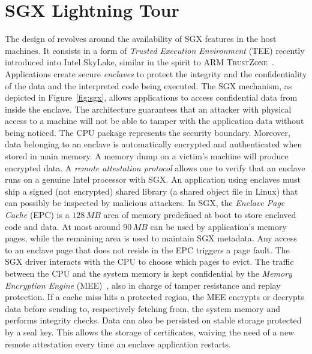 \section{SGX Lightning Tour}\label{sec:background}
The design of \SYS{} revolves around the availability of SGX features in the host machines.
It consists in a form of \emph{Trusted Execution Environment} (TEE) recently introduced into Intel SkyLake, similar in the spirit to ARM \textsc{TrustZone}~\cite{arm2009security}. 
Applications create secure \emph{enclaves} to protect the integrity and the confidentiality of the data and the interpreted code being executed. 
The SGX mechanism, as depicted in Figure~\ref{fig:sgx}, allows applications to access confidential data from inside the enclave. 
The architecture guarantees that an attacker with physical access to a machine will not be able to tamper with the application data without being noticed. 
The CPU package represents the security boundary. 
Moreover, data belonging to an enclave is automatically encrypted and authenticated when stored in main memory. 
A memory dump on a victim’s machine will produce encrypted data. 
A \emph{remote attestation protocol} allows one to verify that an enclave runs on a genuine Intel processor with SGX.
An application using enclaves must ship a signed (not encrypted) shared library (a shared object file in Linux) that can possibly be inspected by malicious attackers. 
In SGX, the \emph{Enclave Page Cache} (EPC) is a $128\,MB$ area of memory predefined at boot to store enclaved code and data. 
At most around $90\,MB$ can be used by application’s memory pages, while the remaining area is used to maintain SGX metadata. 
Any access to an enclave page that does not reside in the EPC triggers a page fault.
The SGX driver interacts with the CPU to choose which pages to evict. 
The traffic between the CPU and the system memory is kept confidential by the \emph{Memory Encryption Engine} (MEE)~\cite{gueron2016memory}, also in charge of tamper resistance and replay protection. 
If a cache miss hits a protected region, the MEE encrypts or decrypts data before sending to, respectively fetching from, the system memory and performs integrity checks. 
Data can also be persisted on stable storage protected by a seal key. 
This allows the storage of certificates, waiving the need of a new remote attestation every time an enclave application restarts.

